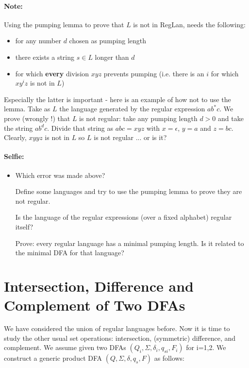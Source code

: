 \paragraph{Note:} Using the pumping lemma to prove that $L$ is not
in RegLan, needs the following:
\begin{itemize}
\item for any number $d$ chosen as pumping length
\item there exists a string $s \in L$ longer than $d$
\item for which {\bf every} division $xyz$ prevents pumping
  (i.e. there is an $i$ for which $xy^iz$ is not in $L$)
\end{itemize}

Especially the latter is important - here is an example of how not to
use the lemma. Take as $L$ the language generated by the regular
expression $ab^*c$.  We prove (wrongly !) that $L$ is not regular:
take any pumping length $d > 0$ and take the string $ab^dc$. Divide that
string as $abc = xyz$ with $x = \epsilon$, $y = a$ and $z =
bc$. Clearly, $xyyz$ is not in $L$ so $L$ is not regular ... or is it?

\paragraph{Selfie:}
\begin{itemize}
\item[]
Which error was made above?

Define some languages and try to use the pumping lemma to prove they
are not regular.

Is the language of the regular expressions (over a fixed alphabet)
regular itself?

Prove: every regular language has a minimal pumping length. Is it
related to the minimal DFA for that language?
\end{itemize}


\section{Intersection, Difference and Complement of Two DFAs}

We have considered the union of regular languages before. Now it is
time to study the other usual set operations: intersection,
(symmetric) difference, and complement. We assume given two DFAs
$(Q_i,\Sigma,\delta_i,q_{si},F_i)$ for i=1,2. We construct a generic
product DFA $(Q,\Sigma,\delta,q_s,F)$ as follows:

